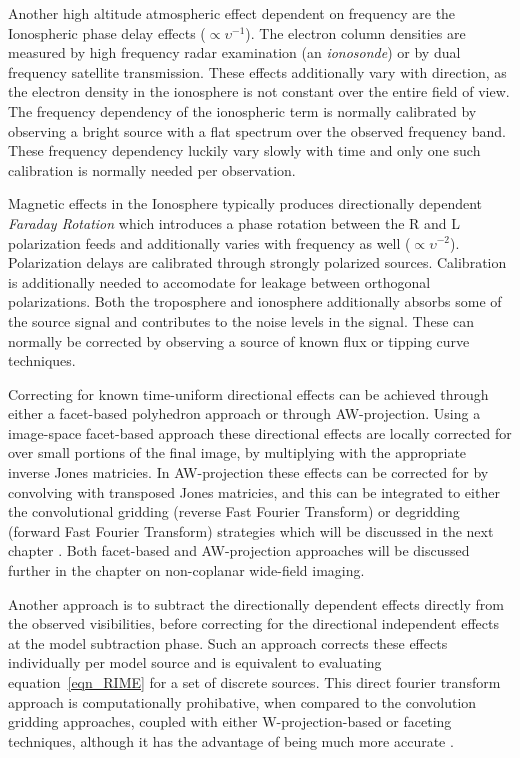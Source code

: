 \documentclass[a4paper,10pt]{report}
\begin{document}
 Another high altitude atmospheric effect dependent on frequency are the Ionospheric phase delay effects ($\propto \upsilon^{-1}$). The electron column densities are measured by high frequency radar examination (an \textit{ionosonde}) or by dual 
 frequency satellite transmission. These effects additionally vary with direction, as the electron density in the ionosphere is not constant over the entire field of view. The frequency dependency of the ionospheric term is 
 normally calibrated by observing a bright source with a flat spectrum over the observed frequency band. These frequency dependency luckily vary slowly with time and only one such calibration is normally needed per observation.

 Magnetic effects in the Ionosphere typically produces directionally dependent \textit{Faraday Rotation} which introduces a phase rotation between the R and L polarization feeds and additionally
 varies with frequency as well ($\propto \upsilon^{-2}$). Polarization delays are calibrated through strongly polarized sources. Calibration is additionally needed to accomodate for leakage between 
 orthogonal polarizations. Both the troposphere and ionosphere additionally absorbs some of the source signal and contributes to the noise levels in the signal. These can normally be corrected by 
 observing a source of known flux or tipping curve techniques.
 
 Correcting for known time-uniform directional effects can be achieved through either a facet-based polyhedron approach or through AW-projection. Using a image-space facet-based approach these directional
 effects are locally corrected for over small portions of the final image, by multiplying with the appropriate inverse Jones matricies. In AW-projection these effects can be corrected for by convolving with
 transposed Jones matricies, and this can be integrated to either the convolutional gridding (reverse Fast Fourier Transform) or degridding (forward Fast Fourier Transform) strategies which will be discussed 
 in the next chapter \cite{2011A&A...527A.107S}. Both facet-based and AW-projection approaches will be discussed further in the chapter on non-coplanar wide-field imaging.
 
 Another approach is to subtract the directionally dependent effects directly from the observed visibilities, before correcting for the directional independent effects at the model
 subtraction phase. Such an approach corrects these effects individually per model source and is equivalent to evaluating equation~\ref{eqn_RIME} for a set of discrete sources. This
 direct fourier transform approach is computationally prohibative, when compared to the convolution gridding approaches, coupled with either W-projection-based or faceting techniques, although
 it has the advantage of being much more accurate \cite{2011A&A...527A.107S}.
 
\end{document}

